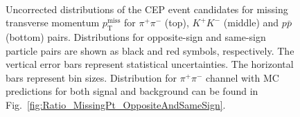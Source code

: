 \begin{figure}[h]
{  \begin{subfigure}[b]{\linewidth}\addtocounter{subfigure}{-2}\vspace*{17pt}
  \end{subfigure}\\
  \begin{minipage}[t][1.042\linewidth][t]{\linewidth}\vspace{20pt}
    \caption[....]{Uncorrected distributions of the CEP event candidates for missing transverse momentum $p_\mathrm{T}^\mathrm{\scriptscriptstyle miss}$ for $\pi^+\pi^-$ (top), $K^+K^-$ (middle) and $p\bar{p}$ (bottom) pairs. Distributions for opposite-sign and same-sign particle pairs are shown as black and red symbols, respectively. The vertical error bars represent statistical uncertainties. The horizontal bars represent bin sizes. Distribution for $\pi^+\pi^-$ channel with MC predictions for both signal and background can be found in Fig.~\ref{fig:Ratio_MissingPt_OppositeAndSameSign}.}\label{fig:MissingPt}
  \end{minipage}
}%
\end{figure}

 



% 
% 

